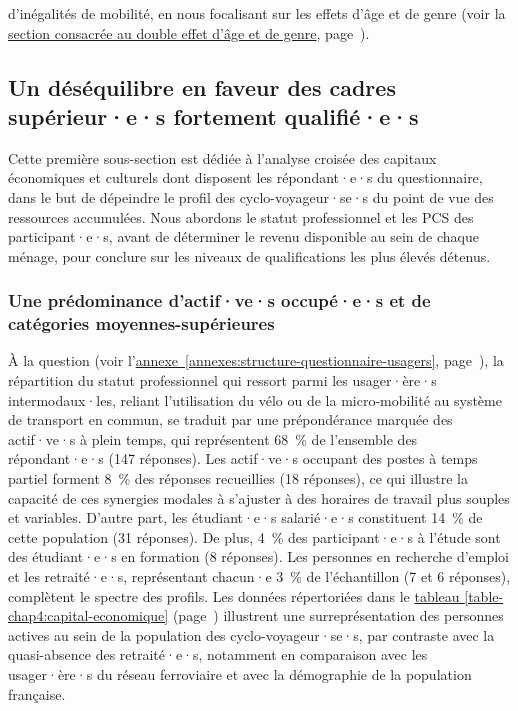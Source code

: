 \begin{refsegment}
{} d'inégalités de mobilité, en nous focalisant sur les effets d'âge et de genre (voir la \hyperref[chap4:demographie]{section consacrée au double effet d'âge et de genre}, page~\pageref{chap4:demographie}).

\subsection{Un déséquilibre en faveur des cadres supérieur·e·s fortement qualifié·e·s
    \label{chap4:capital-economique-culturel}
    }

Cette première sous-section est dédiée à l'analyse croisée des capitaux économiques et culturels dont disposent les répondant·e·s du questionnaire, dans le but de dépeindre le profil des cyclo-voyageur·se·s du point de vue des ressources accumulées. Nous abordons le statut professionnel et les \acrfull{PCS} des participant·e·s, avant de déterminer le revenu disponible au sein de chaque ménage, pour conclure sur les niveaux de qualifications les plus élevés détenus.%

\subsubsection*{Une prédominance d'actif·ve·s occupé·e·s et de catégories moyennes-supérieures
    \label{chap4:capital-economique-statut-pcs}
    }

À la question  (voir l'\hyperref[annexes:structure-questionnaire-usagers]{annexe~\ref{annexes:structure-questionnaire-usagers}}, page~\pageref{annexes:structure-questionnaire-usagers}), la répartition du statut professionnel qui ressort parmi les usager·ère·s intermodaux·les, reliant l'utilisation du vélo ou de la micro-mobilité au système de transport en commun, se traduit par une prépondérance marquée des actif·ve·s à plein temps, qui représentent 68~\% de l'ensemble des répondant·e·s (147 réponses). Les actif·ve·s occupant des postes à temps partiel forment 8~\% des réponses recueillies (18 réponses), ce qui illustre la capacité de ces synergies modales à s'ajuster à des horaires de travail plus souples et variables. D'autre part, les étudiant·e·s salarié·e·s constituent 14~\% de cette population (31 réponses). De plus, 4~\% des participant·e·s à l'étude sont des étudiant·e·s en formation (8 réponses). Les personnes en recherche d'emploi et les retraité·e·s, représentant chacun·e 3~\% de l'échantillon (7 et 6 réponses), complètent le spectre des profils. Les données répertoriées dans le \hyperref[table-chap4:capital-economique]{tableau \ref{table-chap4:capital-economique}} (page~\pageref{table-chap4:capital-economique}) illustrent une surreprésentation des personnes actives au sein de la population des cyclo-voyageur·se·s, par contraste avec la quasi-absence des retraité·e·s, notamment en comparaison avec les usager·ère·s du réseau ferroviaire et avec la démographie de la population française.%


\end{refsegment}
